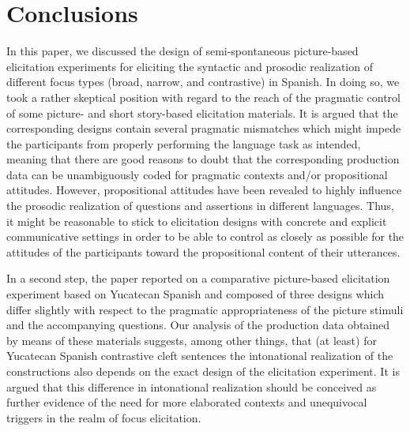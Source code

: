 \documentclass[output=paper]{langsci/langscibook}
\begin{document}
\section{Conclusions}
\label{sec:uth:5}
In this paper, we discussed the design of semi-spontaneous picture-based elicitation experiments for eliciting the syntactic and prosodic realization of different focus types (broad, narrow, and contrastive) in Spanish. In doing so, we took a rather skeptical position with regard to the reach of the pragmatic control of some picture- and short story-based elicitation materials. It is argued that the corresponding designs contain several pragmatic mismatches which might impede the participants from properly performing the language task as intended, meaning that there are good reasons to doubt that the corresponding production data can be unambiguously coded for pragmatic contexts and/or propositional attitudes. However, propositional attitudes have been revealed to highly influence the prosodic realization of questions and assertions in different languages. Thus, it might be reasonable to stick to elicitation designs with concrete and explicit communicative settings in order to be able to control as closely as possible for the attitudes of the participants toward the propositional content of their utterances. 

In a second step, the paper reported on a comparative picture-based elicitation experiment based on Yucatecan Spanish and composed of three designs which differ slightly with respect to the pragmatic appropriateness of the picture stimuli and the accompanying questions. Our analysis of the production data obtained by means of these materials suggests, among other things, that (at least) for Yucatecan Spanish contrastive cleft sentences the intonational realization of the constructions also depends on the exact design of the elicitation experiment. It is argued that this difference in intonational realization should be conceived as further evidence of the need for more elaborated contexts and unequivocal triggers in the realm of focus elicitation. 

{\sloppy
\printbibliography[heading=subbibliography,notkeyword=this]
}
\end{document}
